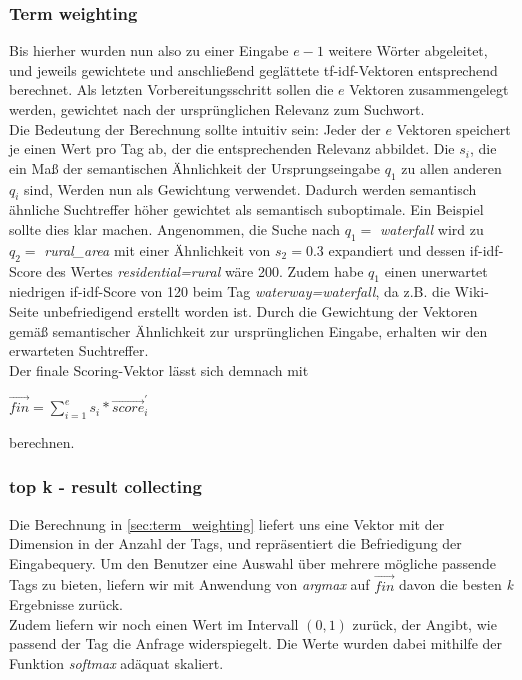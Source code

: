 \documentclass[12pt,pdftex,a4paper]{article}
\begin{document}
\subsubsection{Term weighting}\label{sec:term_weighting}
Bis hierher wurden nun also zu einer Eingabe $e-1$ weitere Wörter abgeleitet, und jeweils gewichtete und anschließend geglättete tf-idf-Vektoren entsprechend berechnet. Als letzten Vorbereitungsschritt sollen die $e$ Vektoren zusammengelegt werden, gewichtet nach der ursprünglichen Relevanz zum Suchwort.\\
Die Bedeutung der Berechnung sollte intuitiv sein: Jeder der $e$ Vektoren speichert je einen Wert pro Tag ab, der die entsprechenden Relevanz abbildet. Die $s_i$, die ein Maß der semantischen Ähnlichkeit der Ursprungseingabe $q_1$ zu allen anderen $q_i$ sind, Werden nun als Gewichtung verwendet. Dadurch werden semantisch ähnliche Suchtreffer höher gewichtet als semantisch suboptimale. Ein Beispiel sollte dies klar machen. Angenommen, die Suche nach $q_1 =$ \textit{waterfall} wird zu $q_2 =$ \textit{rural\_area} mit einer Ähnlichkeit von  $s_2 = 0.3$ expandiert und dessen if-idf-Score des Wertes \textit{residential=rural} wäre 200. Zudem habe $q_1 $ einen unerwartet niedrigen if-idf-Score von 120 beim Tag \textit{waterway=waterfall}, da z.B. die Wiki-Seite unbefriedigend erstellt worden ist. Durch die Gewichtung der Vektoren gemäß semantischer Ähnlichkeit zur ursprünglichen Eingabe, erhalten wir den erwarteten Suchtreffer.\\
Der finale Scoring-Vektor lässt sich demnach mit\\
\begin{center}
	$\vec{fin} = \sum_{i=1}^{e} s_i * \vec{score}_{i}^{'}$
\end{center} berechnen.

\subsubsection{top k - result collecting}
Die Berechnung in \autoref{sec:term_weighting} liefert uns eine Vektor mit der Dimension in der Anzahl der Tags, und repräsentiert die Befriedigung der Eingabequery. Um den Benutzer eine Auswahl über mehrere mögliche passende Tags zu bieten, liefern wir mit Anwendung von \textit{argmax} auf $\vec{fin}$ davon die besten \textit{k} Ergebnisse zurück.\\
Zudem liefern wir noch einen Wert im Intervall $(0,1)$ zurück, der Angibt, wie passend der Tag die Anfrage widerspiegelt. Die Werte wurden dabei mithilfe der Funktion \textit{softmax} adäquat skaliert.
\pagebreak
\end{document}
